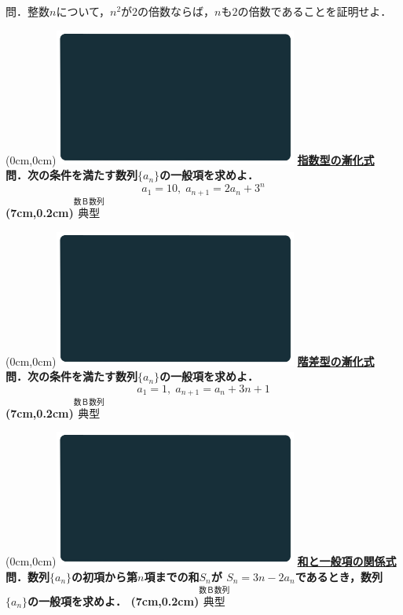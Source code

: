 \documentclass[10pt,
fleqn,
dvipdfmx,
uplatex
]{jsarticle}
\begin{document}
\LARGE 
問．整数$n$について，$n^2$が$2$の倍数ならば，$n$も$2$の倍数であることを証明せよ．


\newpage



\at(0cm,0cm){\includegraphics[width=8cm,bb=0 0 1920 1080]{./youtube/thumbnails/templates/smart_background/数B数列.jpeg}}
{\color{orange}\bf\boldmath\Large\underline{指数型の漸化式}}\vspace{0.3zw}\\
\Large 
\bf\boldmath 問．次の条件を満たす数列$\{a_n\}$の一般項を求めよ．
\[a_1={10},\;a_{n+1}=2a_n+3^n\]
\at(7cm,0.2cm){\small\color{bradorange}$\overset{\text{数Ｂ数列}}{\text{典型}}$}

\newpage

\at(0cm,0cm){\includegraphics[width=8cm,bb=0 0 1920 1080]{./youtube/thumbnails/templates/smart_background/数B数列.jpeg}}
{\color{orange}\bf\boldmath\Large\underline{階差型の漸化式}}\vspace{0.3zw}\\
\Large 
\bf\boldmath 問．次の条件を満たす数列$\{a_n\}$の一般項を求めよ．
\[a_1=1,\;a_{n+1}=a_n+3n+1\]
\at(7cm,0.2cm){\small\color{bradorange}$\overset{\text{数Ｂ数列}}{\text{典型}}$}

\newpage

\at(0cm,0cm){\includegraphics[width=8cm,bb=0 0 1920 1080]{./youtube/thumbnails/templates/smart_background/数B数列.jpeg}}
{\color{orange}\bf\boldmath\Large\underline{和と一般項の関係式}}\vspace{0.3zw}\\
\Large 
\bf\boldmath 問．数列$\{a_n\}$の初項から第$n$項までの和$S_n$が
$S_n=3n-2a_n$であるとき，数列$\{a_n\}$の一般項を求めよ．
\at(7cm,0.2cm){\small\color{bradorange}$\overset{\text{数Ｂ数列}}{\text{典型}}$}
\end{document}
